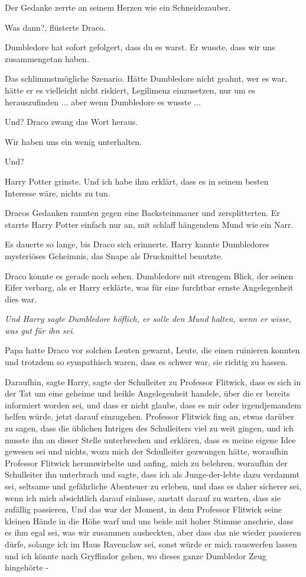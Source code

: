 Der Gedanke zerrte an seinem Herzen wie ein Schneidezauber.

\glqq{}Was dann?\grqq{}, flüsterte Draco.

\glqq{}Dumbledore hat sofort gefolgert, dass du es warst. Er wusste, dass wir
uns zusammengetan haben.\grqq{}

Das schlimmstmögliche Szenario. Hätte Dumbledore nicht geahnt, wer es war, hätte
er es vielleicht nicht riskiert, Legilimenz einzusetzen, nur um es
herauszufinden ... aber wenn Dumbledore es wusste ...

\glqq{}Und?\grqq{} Draco zwang das Wort heraus.

\glqq{}Wir haben uns ein wenig unterhalten.\grqq{}

\glqq{}Und?\grqq{}

Harry Potter grinste. \glqq{}Und ich habe ihm erklärt, dass es in seinem besten
Interesse wäre, nichts zu tun.\grqq{}

Dracos Gedanken rannten gegen eine Backsteinmauer und zersplitterten. Er starrte
Harry Potter einfach nur an, mit schlaff hängendem Mund wie ein Narr.

Es dauerte so lange, bis Draco sich erinnerte. Harry kannte Dumbledores
mysteriöses Geheimnis, das Snape als Druckmittel benutzte.

Draco konnte es gerade noch sehen. Dumbledore mit strengem Blick, der seinen
Eifer verbarg, als er Harry erklärte, was für eine furchtbar ernste
Angelegenheit dies war.


\emph{Und Harry sagte Dumbledore höflich, er solle den Mund halten, wenn er
wisse, was gut für ihn sei}.

Papa hatte Draco vor solchen Leuten gewarnt, Leute, die einen ruinieren konnten
und trotzdem so sympathisch waren, dass es schwer war, sie richtig zu hassen.

\glqq{}Daraufhin\grqq{}, sagte Harry, \glqq{}sagte der Schulleiter zu Professor
Flitwick, dass es sich in der Tat um eine geheime und heikle Angelegenheit
handele, über die er bereits informiert worden sei, und dass er nicht glaube,
dass es mir oder irgendjemandem helfen würde, jetzt darauf einzugehen. Professor
Flitwick fing an, etwas darüber zu sagen, dass die üblichen Intrigen des
Schulleiters viel zu weit gingen, und ich musste ihn an dieser Stelle
unterbrechen und erklären, dass es meine eigene Idee gewesen sei und nichts,
wozu mich der Schulleiter gezwungen hätte, woraufhin Professor Flitwick
herumwirbelte und anfing, mich zu belehren, woraufhin der Schulleiter ihn
unterbrach und sagte, dass ich als Junge-der-lebte dazu verdammt sei, seltsame
und gefährliche Abenteuer zu erleben, und dass es daher sicherer sei, wenn ich
mich absichtlich darauf einlasse, anstatt darauf zu warten, dass sie zufällig
passieren, Und das war der Moment, in dem Professor Flitwick seine kleinen Hände
in die Höhe warf und uns beide mit hoher Stimme anschrie, dass es ihm egal sei,
was wir zusammen ausheckten, aber dass das nie wieder passieren dürfe, solange
ich im Haus Ravenclaw sei, sonst würde er mich rauswerfen lassen und ich könnte
nach Gryffindor gehen, wo dieses ganze Dumbledor Zeug hingehörte -\grqq{}

